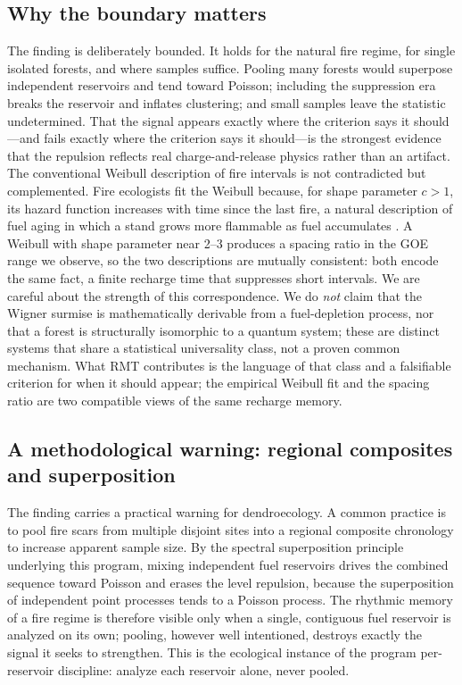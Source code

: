 \documentclass[12pt,a4paper]{article}
\begin{document}
\subsection{Why the boundary matters}
The finding is deliberately bounded. It holds for the natural fire regime, for single isolated forests, and where samples suffice. Pooling many forests would superpose independent reservoirs and tend toward Poisson; including the suppression era breaks the reservoir and inflates clustering; and small samples leave the statistic undetermined. That the signal appears exactly where the criterion says it should---and fails exactly where the criterion says it should---is the strongest evidence that the repulsion reflects real charge-and-release physics rather than an artifact. The conventional Weibull description of fire intervals is not contradicted but complemented. Fire ecologists fit the Weibull because, for shape parameter $c>1$, its hazard function increases with time since the last fire, a natural description of fuel aging in which a stand grows more flammable as fuel accumulates \citep{grissino1999}. A Weibull with shape parameter near 2--3 produces a spacing ratio in the GOE range we observe, so the two descriptions are mutually consistent: both encode the same fact, a finite recharge time that suppresses short intervals. We are careful about the strength of this correspondence. We do \emph{not} claim that the Wigner surmise is mathematically derivable from a fuel-depletion process, nor that a forest is structurally isomorphic to a quantum system; these are distinct systems that share a statistical universality class, not a proven common mechanism. What RMT contributes is the language of that class and a falsifiable criterion for when it should appear; the empirical Weibull fit and the spacing ratio are two compatible views of the same recharge memory.

\subsection{A methodological warning: regional composites and superposition}
The finding carries a practical warning for dendroecology. A common practice is to pool fire scars from multiple disjoint sites into a regional composite chronology to increase apparent sample size. By the spectral superposition principle underlying this program, mixing independent fuel reservoirs drives the combined sequence toward Poisson and erases the level repulsion, because the superposition of independent point processes tends to a Poisson process. The rhythmic memory of a fire regime is therefore visible only when a single, contiguous fuel reservoir is analyzed on its own; pooling, however well intentioned, destroys exactly the signal it seeks to strengthen. This is the ecological instance of the program per-reservoir discipline: analyze each reservoir alone, never pooled.
\end{document}
